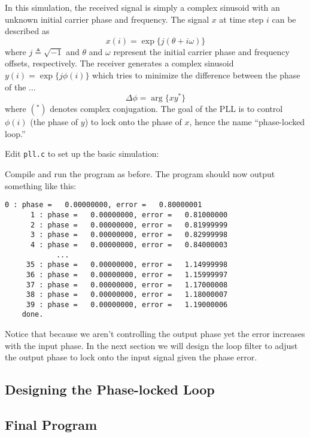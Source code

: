 In this simulation, the received signal is simply a complex sinusoid
with an unknown initial carrier phase and frequency.
The signal $x$ at time step $i$ can be described as
\[
    x(i) = \exp\bigl\{ j(\theta + i\omega) \bigr\}
\]
where $j \triangleq \sqrt{-1}$ and
$\theta$ and $\omega$ represent the initial carrier phase and
frequency offsets, respectively.
The receiver generates a complex sinusoid
$y(i) = \exp\bigl\{j\phi(i)\bigr\}$
which tries to minimize the difference between the phase of the ...
\[
    \Delta\phi = \arg\bigl\{ x y^* \bigr\}
\]
where $(^*)$ denotes complex conjugation.
The goal of the PLL is to control $\phi(i)$ (the phase of $y$) to lock
onto the phase of $x$, hence the name ``phase-locked loop.''

Edit {\tt pll.c} to set up the basic simulation:
%

%
Compile and run the program as before.
The program should now output something like this:
%
\begin{Verbatim}[fontsize=\small]
      0 : phase =   0.00000000, error =   0.80000001
      1 : phase =   0.00000000, error =   0.81000000
      2 : phase =   0.00000000, error =   0.81999999
      3 : phase =   0.00000000, error =   0.82999998
      4 : phase =   0.00000000, error =   0.84000003
            ...
     35 : phase =   0.00000000, error =   1.14999998
     36 : phase =   0.00000000, error =   1.15999997
     37 : phase =   0.00000000, error =   1.17000008
     38 : phase =   0.00000000, error =   1.18000007
     39 : phase =   0.00000000, error =   1.19000006
    done.
\end{Verbatim}
%
Notice that because we aren't controlling the output phase yet
the error increases with the input phase.
In the next section we will design the loop filter to adjust the output
phase to lock onto the input signal given the phase error.

\subsection{Designing the Phase-locked Loop}
\label{tutorial:pll:design}


\subsection{Final Program}
\label{tutorial:pll:completed}

